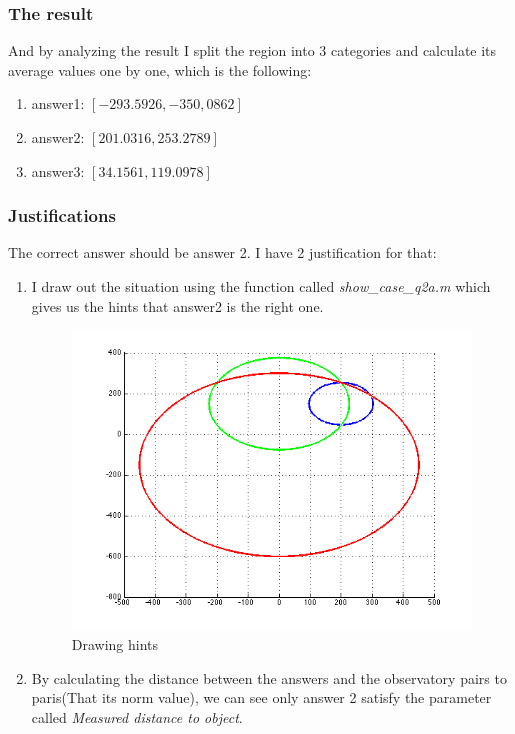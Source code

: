 \documentclass[11pt]{article}
\begin{document}
\subsubsection{The result}
And by analyzing the result I split the region into 3 categories and calculate its average values one by one, 
which is the following:

\begin{enumerate}
\item answer1: $[-293.5926,-350,0862]$
\item answer2: $[201.0316,253.2789]$
\item answer3: $[34.1561,119.0978]$
\end{enumerate}

\subsubsection{Justifications}
The correct answer should be answer 2. I have 2 justification for that:

\begin{enumerate}

\item I draw out the situation using the function called \textit{show\_case\_q2a.m} which gives us the hints that answer2 is the right one.

\begin{figure}[h]
\centering
\includegraphics[scale=0.2]{p2.png}
\caption{Drawing hints}

\end{figure}

\item By calculating the distance between the answers and the observatory pairs to paris(That its norm value), we can see only answer 2 satisfy the parameter called \textit{Measured distance to object}.



\end{enumerate}
\end{document}
